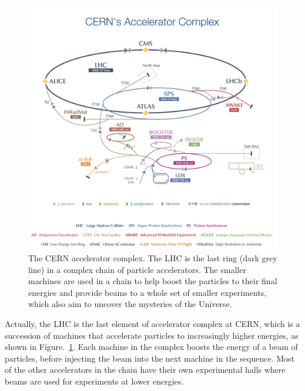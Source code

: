 \begin{figure}[!hbtp]
\centering
\includegraphics[width=1\textwidth]{Figures/02_Detector/LHC}%
\caption{The CERN accelerator complex.
The LHC is the last ring (dark grey line) in a complex chain of particle accelerators. 
The smaller machines are used in a chain to help boost the particles to their final energies and provide beams to a whole set of smaller experiments, 
which also aim to uncover the mysteries of the Universe\supercite{Haffner:1621894}.}
\label{fig:LHC}
\end{figure}


Actually, 
the LHC is the last element of accelerator complex at CERN,
which is a succession of machines that accelerate particles to increasingly higher energies, as shown in Figure.~\ref{fig:LHC}.
Each machine in the complex boosts the energy of a beam of particles, before injecting the beam into the next machine in the sequence. 
Most of the other accelerators in the chain have their own experimental halls where beams are used for experiments at lower energies.

